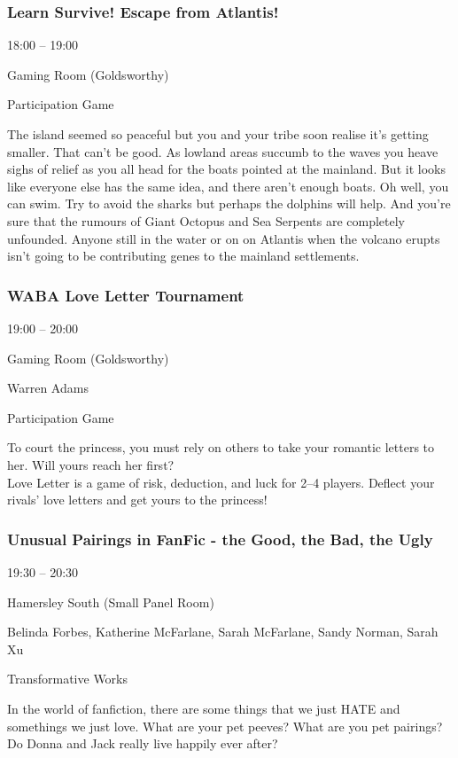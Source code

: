 \documentclass{scrreprt}
\begin{document}
\begin{multicols}{2}
\subsubsection*{Learn Survive! Escape from Atlantis!}\begin{description}
\setlength{\itemsep}{0pt}
\setlength{\parsep}{0pt}
\setlength{\parskip}{0pt}
\item[Time:]{18:00 -- 19:00}
\item[Venue:]{Gaming Room (Goldsworthy)}
\item[Tags:]{Participation Game}\end{description}
The island seemed so peaceful but you and your tribe soon realise it's getting smaller. That can't be good. As lowland areas succumb to the waves you heave sighs of relief as you all head for the boats pointed at the mainland. But it looks like everyone else has the same idea, and there aren't enough boats. Oh well, you can swim. Try to avoid the sharks but perhaps the dolphins will help. And you're sure that the rumours of Giant Octopus and Sea Serpents are completely unfounded. Anyone still in the water or on on Atlantis when the volcano erupts isn't going to be contributing genes to the mainland settlements.
\subsubsection*{WABA Love Letter Tournament}\begin{description}
\setlength{\itemsep}{0pt}
\setlength{\parsep}{0pt}
\setlength{\parskip}{0pt}
\item[Time:]{19:00 -- 20:00}
\item[Venue:]{Gaming Room (Goldsworthy)}
\item[People:]{Warren Adams}
\item[Tags:]{Participation Game}\end{description}
To court the princess, you must rely on others to take your romantic letters to her. Will yours reach her first?\\Love Letter is a game of risk, deduction, and luck for 2–4 players. Deflect your rivals' love letters and get yours to the princess!
\subsubsection*{Unusual Pairings in FanFic - the Good, the Bad, the Ugly}\begin{description}
\setlength{\itemsep}{0pt}
\setlength{\parsep}{0pt}
\setlength{\parskip}{0pt}
\item[Time:]{19:30 -- 20:30}
\item[Venue:]{Hamersley South (Small Panel Room)}
\item[People:]{Belinda Forbes, Katherine McFarlane, Sarah McFarlane, Sandy Norman, Sarah Xu}
\item[Tags:]{Transformative Works}\end{description}
In the world of fanfiction, there are some things that we just HATE and somethings we just love. What are your pet peeves? What are you pet pairings? Do Donna and Jack really live happily ever after?

\end{multicols}
\end{document}
